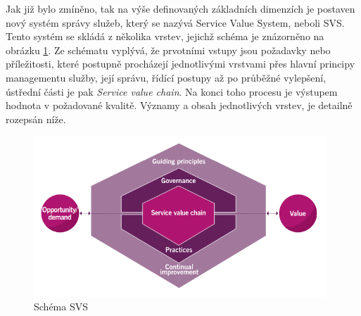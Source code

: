 \documentclass[
  digital,     %
  twoside,     %
  lof,         %
  lot,         %
]{fithesis4}
\begin{document}
\vspace{5}
Jak již bylo zmíněno, tak na výše definovaných základních dimenzích je postaven nový systém správy služeb, který se nazývá Service Value System, neboli SVS. Tento systém se skládá z několika vrstev, jejichž schéma je znázorněno na obrázku \ref{fig:SVS_schema}. Ze schématu vyplývá, že prvotními vstupy jsou požadavky nebo příležitosti, které postupně procházejí jednotlivými vrstvami přes hlavní principy managementu služby, její správu, řídící postupy až po průběžné vylepšení, ústřední části je pak \emph{Service value chain}. Na konci toho procesu je výstupem hodnota v požadované kvalitě. \parencite[s.~14]{Cartlidge2020} Významy a obsah jednotlivých vrstev, je detailně rozepsán níže. 
    \begin{figure}[h]
        \begin{center}
            \includegraphics[width=11cm]{img/SVS_schmea.png}
        \end{center}
        \caption{Schéma SVS \parencite[s.~21]{Cartlidge2020}}
        \label{fig:SVS_schema}
    \end{figure} 
\end{document}
